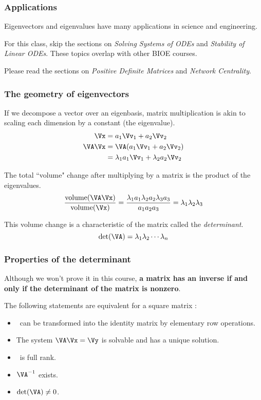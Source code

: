 \documentclass{beamer}
\begin{document}
\begin{frame}
\frametitle{Applications}

Eigenvectors and eigenvalues have many applications in science and engineering.

\medskip
For this class, skip the sections on \emph{Solving Systems of ODEs} and \emph{Stability of Linear ODEs}. These topics overlap with other BIOE courses.

\medskip
Please read the sections on \emph{Positive Definite Matrices} and \emph{Network Centrality}.	
\end{frame}

\begin{frame}
\frametitle{The geometry of eigenvectors}

If we decompose a vector over an eigenbasis, matrix multiplication is akin to scaling each dimension by a constant (the eigenvalue).
\begin{align*}
	\Vx &= a_1\Vv_1 + a_2\Vv_2 \\
	\VA\Vx &= \VA(a_1\Vv_1 + a_2\Vv_2) \\
		&= \lambda_1 a_1\Vv_1 + \lambda_2 a_2\Vv_2
\end{align*}

\pause
The total ``volume" change after multiplying by a matrix is the product of the eigenvalues.
\[ \frac{\mathrm{volume}(\VA\Vx)}{\mathrm{volume}(\Vx)} = \frac{\lambda_1 a_1 \lambda_2 a_2 \lambda_3 a_3}{a_1 a_2 a_3} = \lambda_1\lambda_2\lambda_3 \]

\pause
This volume change is a characteristic of the matrix called the \emph{determinant}.
\[ \det(\VA) = \lambda_1\lambda_2\cdots\lambda_n \]
\end{frame}

\begin{frame}
\frametitle{Properties of the determinant}

Although we won't prove it in this course, {\bf a matrix has an inverse if and only if the determinant of the matrix is nonzero}. 

\pause
\bigskip
The following statements are equivalent for a square matrix \VA:
\begin{itemize}
	\item \VA\ can be transformed into the identity matrix by elementary row operations.
	\item The system $\VA\Vx = \Vy$ is solvable and has a unique solution.
	\item \VA\ is full rank.
	\item $\VA^{-1}$ exists.
	\item $\det(\VA) \ne 0$.
\end{itemize}
\end{frame}
\end{document}
